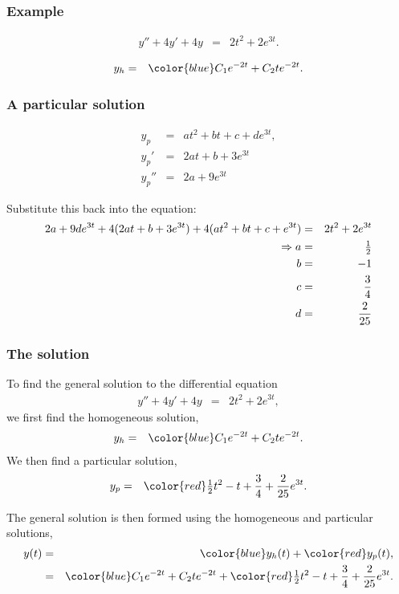 \begin{frame}
  \frametitle{Example}

  \begin{eqnarray*}
    y'' + 4y' + 4y & = & 2t^2 + 2 e^{3t}.
  \end{eqnarray*}

  {
    \begin{eqnarray*}
      y_h & = & {\color{blue}C_1 e^{-2t} + C_2 t e^{-2t}}.
    \end{eqnarray*}
  }

\end{frame}


\begin{frame}
  \frametitle{A particular solution}

  \begin{eqnarray*}
    y_p & = & at^2 + bt + c + d e^{3t}, \\
    y_p' & = & 2at + b + 3e^{3t} \\
    y_p'' & = & 2a + 9 e^{3t}
  \end{eqnarray*}

  Substitute this back into the equation:
  \begin{eqnarray*}
    2a+9de^{3t}+4(2at+b + 3 e^{3t})+4(at^2+bt+c+e^{3t})&=&2t^2+2e^{3t}\\
    \Rightarrow 
    a & = & \mbox{$\frac{1}{2}$} \\
    b & = & -1 \\
    c & = & \frac{3}{4} \\
    d & = & \frac{2}{25}
  \end{eqnarray*}

\end{frame}


\begin{frame}
  \frametitle{The  solution}

  To find the general solution to the differential equation
  \begin{eqnarray*}
    y'' + 4y' + 4y & = & 2t^2 + 2 e^{3t},
  \end{eqnarray*}
  we first find the homogeneous solution,
  \begin{eqnarray*}
    y_h & = & {\color{blue}C_1 e^{-2t} + C_2 t e^{-2t}}.
  \end{eqnarray*}
  We then find a particular solution,
  \begin{eqnarray*}
    y_p & = & {\color{red}\half t^2 - t +  \frac{3}{4} + \frac{2}{25} e^{3t}}.
  \end{eqnarray*}

  The general solution is then formed using the homogeneous and particular solutions,
  \begin{eqnarray*}
    y(t) & = & {\color{blue}y_h(t)} + {\color{red}y_p(t)}, \\
         & = & {\color{blue}C_1 e^{-2t} + C_2 t e^{-2t}} + {\color{red}\half t^2 - t + \frac{3}{4} + \frac{2}{25} e^{3t}}.
  \end{eqnarray*}

\end{frame}



